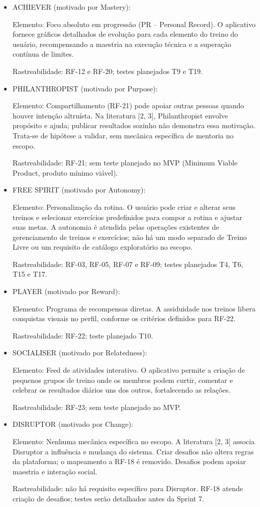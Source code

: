 \begin{itemize}
\item ACHIEVER (motivado por Mastery):

Elemento: Foco absoluto em progressão (PR -- Personal Record). O aplicativo fornece gráficos detalhados de evolução para cada elemento do treino do usuário, recompensando a maestria na execução técnica e a superação contínua de limites.

Rastreabilidade: RF-12 e RF-20; testes planejados T9 e T19.

\item PHILANTHROPIST (motivado por Purpose):

Elemento: Compartilhamento (RF-21) pode apoiar outras pessoas quando houver intenção altruísta. Na literatura [2, 3], Philanthropist envolve propósito e ajuda; publicar resultados sozinho não demonstra essa motivação. Trata-se de hipótese a validar, sem mecânica específica de mentoria no escopo.

Rastreabilidade: RF-21; sem teste planejado no MVP (Minimum Viable Product, produto mínimo viável).

\item FREE SPIRIT (motivado por Autonomy):

Elemento: Personalização da rotina. O usuário pode criar e alterar seus treinos e selecionar exercícios predefinidos para compor a rotina e ajustar suas metas. A autonomia é atendida pelas operações existentes de gerenciamento de treinos e exercícios; não há um modo separado de Treino Livre ou um requisito de catálogo exploratório no escopo.

Rastreabilidade: RF-03, RF-05, RF-07 e RF-09; testes planejados T4, T6, T15 e T17.

\item PLAYER (motivado por Reward):

Elemento: Programa de recompensas diretas. A assiduidade nos treinos libera conquistas visuais no perfil, conforme os critérios definidos para RF-22.

Rastreabilidade: RF-22; teste planejado T10.

\item SOCIALISER (motivado por Relatedness):

Elemento: Feed de atividades interativo. O aplicativo permite a criação de pequenos grupos de treino onde os membros podem curtir, comentar e celebrar os resultados diários uns dos outros, fortalecendo as relações.

Rastreabilidade: RF-23; sem teste planejado no MVP.

\item DISRUPTOR (motivado por Change):

Elemento: Nenhuma mecânica específica no escopo. A literatura [2, 3] associa Disruptor a influência e mudança do sistema. Criar desafios não altera regras da plataforma; o mapeamento a RF-18 é removido. Desafios podem apoiar maestria e interação social.

Rastreabilidade: não há requisito específico para Disruptor. RF-18 atende criação de desafios; testes serão detalhados antes da Sprint 7.

\end{itemize}

